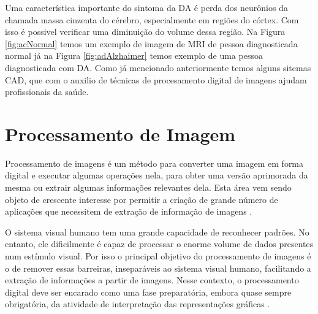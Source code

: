 \documentclass[openright]{UFRGS} %
\begin{document}
Uma característica importante do sintoma da DA é perda dos neurônios da chamada massa cinzenta do cérebro, especialmente em regiões do córtex. Com isso é possivel verificar uma diminuição do volume dessa região. 
Na Figura \ref{fig:acNormal}  temos um exemplo de imagem de MRI de pessoa diagnosticada normal já na 
Figura \ref{fig:adAlzhaimer}  temos exemplo de uma pessoa diagnosticada com DA. Como já mencionado anteriormente temos alguns sitemas CAD, que com o auxilio de técnicas de procesamento digital de imagens ajudam profissionais da saúde.


\section{Processamento de Imagem}

Processamento de imagens é um método para converter uma imagem em forma digital e executar algumas operações nela, para obter uma versão aprimorada da mesma ou extrair algumas informações relevantes dela. Esta área vem sendo objeto de crescente interesse por permitir a criação de grande número de aplicações que necessitem de extração de informação de imagens \cite{crosta1999processamento}.

O sistema visual humano tem uma grande capacidade de reconhecer padrões. No entanto, ele dificilmente é capaz de processar o enorme volume de dados presentes num estímulo visual. Por isso o principal objetivo do processamento de imagens é o de remover essas barreiras, inseparáveis ao sistema visual humano, facilitando a extração de informações a partir de imagens. Nesse contexto, o processamento digital deve ser encarado como uma fase preparatória, embora quase sempre obrigatória, da atividade de interpretação das representações gráficas \cite{crosta1999processamento}.
\end{document}
